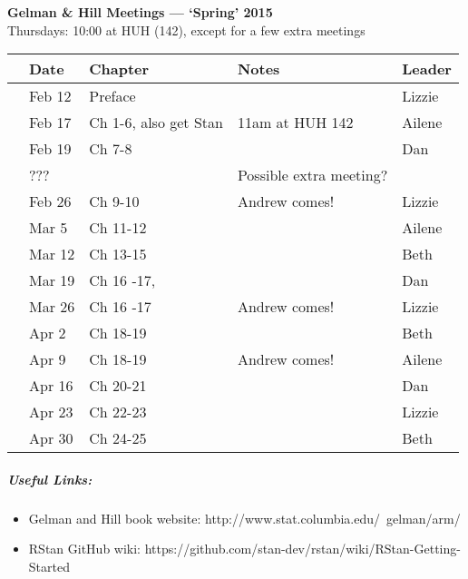 \documentclass[11pt]{article}
\newenvironment{smitemize}{
\begin{itemize}
  \setlength{\itemsep}{0pt}
  \setlength{\parskip}{0.8pt}
  \setlength{\parsep}{0pt}}
{\end{itemize}
}
\begin{document}
 
\raggedright
{}

\begin{center} 
{\large \textbf{Gelman \& Hill Meetings --- `Spring' 2015}} \\ [2pt]
Thursdays: 10:00 at HUH (142), except for a few extra meetings\\
\end{center} 

\begin{center}
\begin{tabular}{ p{0.7 cm}  p{1.5 cm}  p{5 cm}  p{5 cm}  p{1.5 cm} }  \hline \hline
 & \textbf{Date}
   & \textbf{Chapter}
      & \textbf{Notes} 
         & \textbf{Leader} \\ 
\hline \hline
 & Feb 12  &  Preface&        & Lizzie \\\hline
 & Feb 17  & Ch 1-6, also get Stan   &  11am at HUH 142 & Ailene  \\\hline
 & Feb 19  & Ch 7-8 &      & Dan \\\hline
 & ???  &  &  Possible extra meeting?     &  \\\hline
 & Feb 26 & Ch 9-10 &  Andrew comes! & Lizzie  \\\hline
 & Mar 5 & Ch 11-12 &        & Ailene   \\\hline
 & Mar 12 & Ch 13-15 &  & Beth \\\hline
 & Mar 19 & Ch 16 -17, &        & Dan \\\hline
 & Mar 26 & Ch 16 -17 &  Andrew comes! & Lizzie  \\\hline
 & Apr 2& Ch 18-19   &  & Beth  \\\hline
 & Apr 9 & Ch 18-19   &  Andrew comes!& Ailene  \\\hline
 & Apr 16 &Ch 20-21 &  & Dan  \\\hline
 & Apr 23 & Ch 22-23       & & Lizzie \\\hline
 & Apr 30& Ch 24-25  & & Beth\\\hline
\hline
\end{tabular}
\end{center}
\subparagraph{Useful Links:} 
\begin{smitemize}
\item Gelman and Hill book website: http://www.stat.columbia.edu/~gelman/arm/
\item RStan GitHub wiki: https://github.com/stan-dev/rstan/wiki/RStan-Getting-Started
\end{smitemize}
\end{document}
